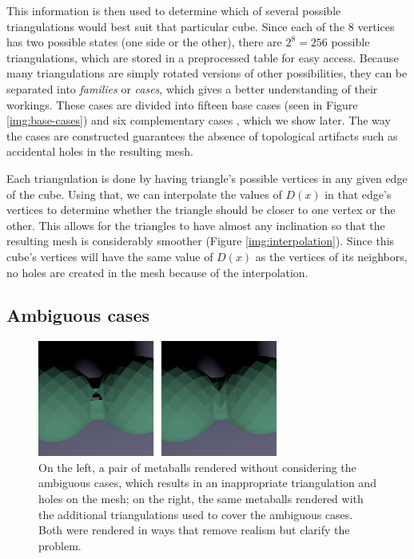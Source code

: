 \documentclass[conference]{acmsiggraph}
\begin{document}
This information is then used to determine which of several possible triangulations would best suit that particular cube. Since each of the 8 vertices has two possible states (one side or the other), there are $2^8 = 256$ possible triangulations, which are stored in a preprocessed table for easy access. Because many triangulations are simply rotated versions of other possibilities, they can be separated into \textit{families} or \textit{cases}, which gives a better understanding of their workings. These cases are divided into fifteen base cases (seen in Figure \ref{img:base-cases}) and six complementary cases \cite{Lingrand}, which we show later. The way the cases are constructed guarantees the absence of topological artifacts such as accidental holes in the resulting mesh.

Each triangulation is done by having triangle's possible vertices in any given edge of the cube. Using that, we can interpolate the values of $D(x)$ in that edge's vertices to determine whether the triangle should be closer to one vertex or the other. This allows for the triangles to have almost any inclination so that the resulting mesh is considerably smoother (Figure \ref{img:interpolation}). Since this cube's vertices will have the same value of $D(x)$ as the vertices of its neighbors, no holes are created in the mesh because of the interpolation.


\subsection{Ambiguous cases}

\begin{figure}[ht]
  \centering
  \includegraphics[height=1.5in]{images/metaball-bad1-comparison}
  \caption{On the left, a pair of metaballs rendered without considering the ambiguous cases, which results in an inappropriate triangulation and holes on the mesh; on the right, the same metaballs rendered with the additional triangulations used to cover the ambiguous cases. Both were rendered in ways that remove realism but clarify the problem.}
  \label{img:interpolation-comparison}
\end{figure}
\end{document}
